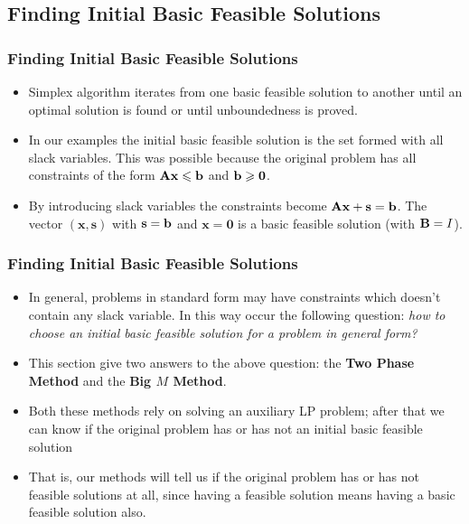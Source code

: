 \documentclass{beamer}
\theoremstyle{plain}
\newcommand{\g}[1]{\textcolor{grena}{\bf #1}}
\newcommand{\git}[1]{\textcolor{grena}{\it #1}}
\let\le\leqslant
\let\ge\geqslant
\def\x{{\mathrm x}}
\def\AA{{\bf \mathrm\bf A}}
\def\BB{{\bf \mathrm\bf B}}
\def\bb{{\bf \mathrm \bf b}}
\def\ss{{\mathbf s}}
\def\x{{\mathbf x}}
\def\zero{{\mathbf 0}}
\begin{document}
\subsection{Finding Initial Basic Feasible Solutions}
\begin{frame}\frametitle{Finding Initial Basic Feasible Solutions}
\justifying

\begin{itemize}
\justifying

\item Simplex algorithm iterates from one basic feasible solution to another until an optimal solution is found or until unboundedness is proved.

\item In our examples the initial basic feasible solution is the set formed with all slack variables. This was possible because the original problem has all constraints of the form $ \AA\x \le \bb $ and $ \bb \ge \zero $. 

\item By introducing slack variables the constraints become $ \AA\x + \ss = \bb $. The vector $ (\x, \ss) $ with $ \ss = \bb $ and $ \x = \zero $ is a basic feasible solution (with $ \BB = I $).


\end{itemize}

\end{frame}

\begin{frame}\frametitle{Finding Initial Basic Feasible Solutions}
\justifying

\begin{itemize}
\justifying

\item In general, problems in standard form may have constraints which doesn't contain any slack variable. In this way occur the following question: \git{how to choose an initial basic feasible solution for a problem in general form?}

\item This section give two answers to the above question: the \g{Two Phase Method} and the \g{Big $ M $ Method}.

\item Both these methods rely on solving an auxiliary LP problem; after that we can know if the original problem has or has not an initial basic feasible solution 

\item That is, our methods will tell us if the original problem has or has not feasible solutions at all, since having a feasible solution means having a basic feasible solution also.

\end{itemize}

\end{frame}
\end{document}
